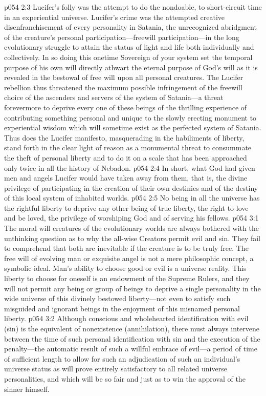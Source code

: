 \pc \vs p054 2:3 Lucifer’s folly was the attempt to do the nondoable, to short\hyp{}circuit time in an experiential universe. Lucifer’s crime was the attempted creative disenfranchisement of every personality in Satania, the unrecognized abridgment of the creature’s personal participation---freewill participation---in the long evolutionary struggle to attain the status of light and life both individually and collectively. In so doing this onetime Sovereign of your system set the temporal purpose of his own will directly athwart the eternal purpose of God’s will as it is revealed in the bestowal of free will upon all personal creatures. The Lucifer rebellion thus threatened the maximum possible infringement of the freewill choice of the ascenders and servers of the system of Satania---a threat forevermore to deprive every one of these beings of the thrilling experience of contributing something personal and unique to the slowly erecting monument to experiential wisdom which will sometime exist as the perfected system of Satania. Thus does the Lucifer manifesto, masquerading in the habiliments of liberty, stand forth in the clear light of reason as a monumental threat to consummate the theft of personal liberty and to do it on a scale that has been approached only twice in all the history of Nebadon.\plusone
\vs p054 2:4 In short, what God had given men and angels Lucifer would have taken away from them, that is, the divine privilege of participating in the creation of their own destinies and of the destiny of this local system of inhabited worlds.
\pc \vs p054 2:5 No being in all the universe has the rightful liberty to deprive any other being of true liberty, the right to love and be loved, the privilege of worshiping God and of serving his fellows.
\vs p054 3:1 The moral will creatures of the evolutionary worlds are always bothered with the unthinking question as to why the all\hyp{}wise Creators permit evil and sin. They fail to comprehend that both are inevitable if the creature is to be truly free. The free will of evolving man or exquisite angel is not a mere philosophic concept, a symbolic ideal. Man’s ability to choose good or evil is a universe reality. This liberty to choose for oneself is an endowment of the Supreme Rulers, and they will not permit any being or group of beings to deprive a single personality in the wide universe of this divinely bestowed liberty---not even to satisfy such misguided and ignorant beings in the enjoyment of this misnamed personal liberty.
\vs p054 3:2 Although conscious and wholehearted identification with evil (sin) is the equivalent of nonexistence (annihilation), there must always intervene between the time of such personal identification with sin and the execution of the penalty---the automatic result of such a willful embrace of evil---a period of time of sufficient length to allow for such an adjudication of such an individual’s universe status as will prove entirely satisfactory to all related universe personalities, and which will be so fair and just as to win the approval of the sinner himself.
